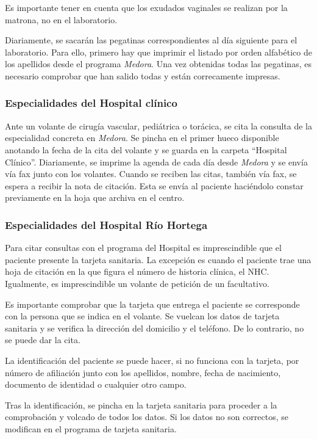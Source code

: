 Es importante tener en cuenta que los exudados vaginales se realizan por la matrona, no en el laboratorio.

Diariamente, se sacarán las pegatinas correspondientes al día siguiente para el laboratorio. Para ello, primero hay que imprimir el listado por orden alfabético de los apellidos desde el programa \textit{Medora}. Una vez obtenidas todas las pegatinas, es necesario comprobar que han salido todas y están correcamente impresas.

\subsubsection{Especialidades del Hospital clínico}

Ante un volante de cirugía vascular, pediátrica o torácica, se cita la consulta de la especialidad concreta en \textit{Medora}.
Se pincha en el primer hueco disponible anotando la fecha de la cita del volante y se guarda en la carpeta ``Hospital Clínico''.
Diariamente, se imprime la agenda de cada día desde \textit{Medora} y se envía vía fax junto con los volantes.
Cuando se reciben las citas, también vía fax, se espera a recibir la nota de citación.
Esta se envía al paciente haciéndolo constar previamente en la hoja que archiva en el centro.

\subsubsection{Especialidades del Hospital Río Hortega}

Para citar consultas con el programa del Hospital es imprescindible que el paciente presente la tarjeta sanitaria.
La excepción es cuando el paciente trae una hoja de citación en la que figura el número de historia clínica, el NHC.
Igualmente, es imprescindible un volante de petición de un facultativo.

Es importante comprobar que la tarjeta que entrega el paciente se corresponde con la persona que se indica en el volante.
Se vuelcan los datos de tarjeta sanitaria y se verifica la dirección del domicilio y el teléfono. De lo contrario, no se puede dar la cita.

La identificación del paciente se puede hacer, si no funciona con la tarjeta, por número de afiliación junto con los apellidos, nombre, fecha de nacimiento, documento de identidad o cualquier otro campo.

Tras la identificación, se pincha en la tarjeta sanitaria para proceder a la comprobación y volcado de todos los datos.
Si los datos no son correctos, se modifican en el programa de tarjeta sanitaria.

